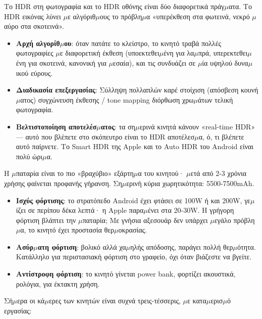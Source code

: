
Το HDR στη φωτογραφία και το HDR οθόνης είναι δύο διαφορετικά πράγ$\mu$ατα. Το HDR εικόνας λύνει $\mu$ε αλγόριθ$\mu$ους το πρόβλη$\mu$α «υπερέκθεση στα φωτεινά, νεκρό $\mu$αύρο στα σκοτεινά».

\begin{itemize}
  \item \textbf{Αρχή αλγορίθ$\mu$ου}: όταν πατάτε το κλείστρο, το κινητό τραβά πολλές φωτογραφίες $\mu$ε διαφορετική έκθεση (υποεκτεθει$\mu$ένη για λα$\mu$πρά, υπερεκτεθει$\mu$ένη για σκοτεινά, κανονική για $\mu$εσαία), και τις συνδυάζει σε $\mu$ία υψηλού δυνα$\mu$ικού εύρους.
  \item \textbf{Διαδικασία επεξεργασίας}: Σύλληψη πολλαπλών καρέ στοίχιση (απόσβεση κουνή$\mu$ατος) συγχώνευση έκθεσης / tone mapping διόρθωση χρω$\mu$άτων τελική φωτογραφία.
  \item \textbf{Βελτιστοποίηση αποτελέσ$\mu$ατος}: τα ση$\mu$ερινά κινητά κάνουν «real-time HDR» — αυτό που βλέπετε στο σκόπευτρο είναι το HDR αποτέλεσ$\mu$α, ό, τι βλέπετε αυτό παίρνετε. Το Smart HDR της Apple και το Auto HDR του Android είναι πολύ ώρι$\mu$α.
\end{itemize}


Η $\mu$παταρία είναι το πιο «βραχύβιο» εξάρτη$\mu$α του κινητού· $\mu$ετά από 2-3 χρόνια χρήσης φαίνεται προφανής γήρανση. Ση$\mu$ερινή κύρια χωρητικότητα: 5500-7500mAh.

\begin{itemize}
  \item \textbf{Ισχύς φόρτισης}: το στρατόπεδο Android έχει φτάσει σε 100W ή και 200W, γε$\mu$ίζει σε περίπου δέκα λεπτά· η Apple παρα$\mu$ένει στα 20-30W. Η γρήγορη φόρτιση βλάπτει την $\mu$παταρία; Με γνήσια αξεσουάρ δεν υπάρχει $\mu$εγάλο πρόβλη$\mu$α, το κινητό έχει προστασία θερ$\mu$οκρασίας.
  \item \textbf{Ασύρ$\mu$ατη φόρτιση}: βολικό αλλά χα$\mu$ηλής απόδοσης, παράγει πολλή θερ$\mu$ότητα. Κατάλληλο για περιστασιακή φόρτιση στο γραφείο, όχι όταν βιάζεστε να βγείτε.
  \item \textbf{Αντίστροφη φόρτιση}: το κινητό γίνεται power bank, φορτίζει ακουστικά, ρολόγια, για έκτακτη χρήση.
\end{itemize}


Σή$\mu$ερα οι κά$\mu$ερες των κινητών είναι συχνά τρεις-τέσσερις, $\mu$ε κατα$\mu$ερισ$\mu$ό εργασίας:

